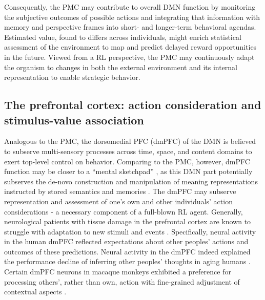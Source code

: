 \documentclass[10pt,letterpaper]{article}
\begin{document}
Consequently, the PMC may contribute to overall DMN function
by monitoring the subjective outcomes
of possible actions and integrating that information
with memory and perspective frames
into short- and longer-term behavioral agendas.
Estimated value, found to differs across individuals, might enrich
statistical assessment of the environment
to map and predict delayed reward opportunities in the future.
Viewed from a RL perspective, the PMC may continuously adapt the organism to changes
in both the external environment and its internal representation
to enable strategic behavior.


\subsection{The prefrontal cortex: action consideration and stimulus-value association}
Analogous to the PMC,
the dorsomedial PFC (dmPFC) of the DMN is believed to subserve
multi-sensory processes
across time, space, and content domains to
exert top-level control on behavior.
Comparing to the PMC, however,
dmPFC function may be closer to a
``mental sketchpad'' \citep{goldman1996prefrontal}, as this DMN part
potentially subserves the de-novo construction and manipulation
of meaning representations instructed by stored semantics and memories
\citep{bzdok2013segregation}.
The dmPFC may subserve representation and assessment
of one's own and other individuals' action considerations - a necessary
component of a full-blown RL agent.
Generally,
neurological patients with tissue damage in the prefrontal cortex
are known to struggle with
adaptation to new stimuli and events
\citep{stuss1986frontal}.
Specifically, neural activity in the human dmPFC
reflected expectations about other peoples' actions and
outcomes of these predictions.
Neural activity in the dmPFC indeed explained the performance decline
of inferring other peoples' thoughts in aging humans \citep{moran2012social}.
Certain dmPFC neurons in macaque monkeys exhibited a preference
for processing others', rather than own, action
with fine-grained adjustment of contextual aspects \citep{yoshida2010neural}.
%
\end{document}

